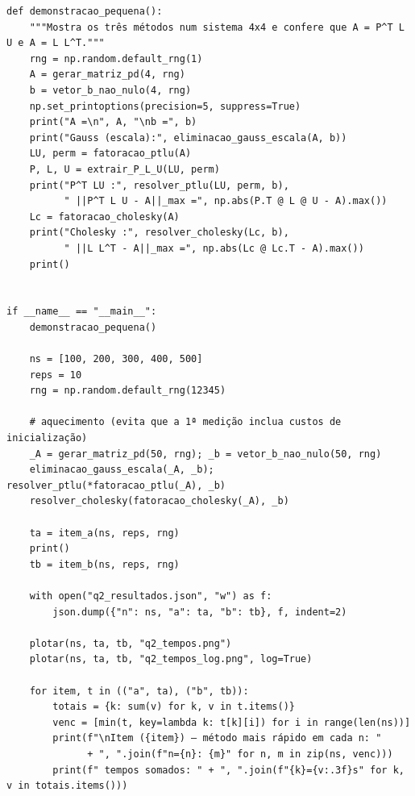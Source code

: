 \documentclass{article}
\theoremstyle{remark}
\begin{document}
\begin{lstlisting}
def demonstracao_pequena():
    """Mostra os três métodos num sistema 4x4 e confere que A = P^T L U e A = L L^T."""
    rng = np.random.default_rng(1)
    A = gerar_matriz_pd(4, rng)
    b = vetor_b_nao_nulo(4, rng)
    np.set_printoptions(precision=5, suppress=True)
    print("A =\n", A, "\nb =", b)
    print("Gauss (escala):", eliminacao_gauss_escala(A, b))
    LU, perm = fatoracao_ptlu(A)
    P, L, U = extrair_P_L_U(LU, perm)
    print("P^T LU :", resolver_ptlu(LU, perm, b),
          " ||P^T L U - A||_max =", np.abs(P.T @ L @ U - A).max())
    Lc = fatoracao_cholesky(A)
    print("Cholesky :", resolver_cholesky(Lc, b),
          " ||L L^T - A||_max =", np.abs(Lc @ Lc.T - A).max())
    print()


if __name__ == "__main__":
    demonstracao_pequena()

    ns = [100, 200, 300, 400, 500]
    reps = 10
    rng = np.random.default_rng(12345)

    # aquecimento (evita que a 1ª medição inclua custos de inicialização)
    _A = gerar_matriz_pd(50, rng); _b = vetor_b_nao_nulo(50, rng)
    eliminacao_gauss_escala(_A, _b); resolver_ptlu(*fatoracao_ptlu(_A), _b)
    resolver_cholesky(fatoracao_cholesky(_A), _b)

    ta = item_a(ns, reps, rng)
    print()
    tb = item_b(ns, reps, rng)

    with open("q2_resultados.json", "w") as f:
        json.dump({"n": ns, "a": ta, "b": tb}, f, indent=2)

    plotar(ns, ta, tb, "q2_tempos.png")
    plotar(ns, ta, tb, "q2_tempos_log.png", log=True)

    for item, t in (("a", ta), ("b", tb)):
        totais = {k: sum(v) for k, v in t.items()}
        venc = [min(t, key=lambda k: t[k][i]) for i in range(len(ns))]
        print(f"\nItem ({item}) — método mais rápido em cada n: "
              + ", ".join(f"n={n}: {m}" for n, m in zip(ns, venc)))
        print(f" tempos somados: " + ", ".join(f"{k}={v:.3f}s" for k, v in totais.items()))
\end{lstlisting}
\end{document}
